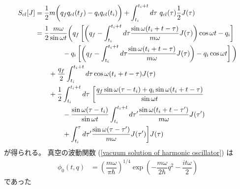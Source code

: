 \begin{align}
    S_{cl} [J]
    &=
    \frac{1}{2} m
    \bigg(
        q_f
        \dot{q}_{cl}(t_f)
    -
        q_i
        \dot{q}_{cl}(t_i)
    \bigg)
    +
    \int_{t_i}^{t_i + t} d\tau\ 
        q_{cl}(\tau)
        \frac{1}{2}
        J(\tau)
\notag\\&
    =
    \frac{1}{2}
    \frac{ m \omega }{ \sin \omega t }
    \bigg(
        q_f
        \left[
            \left(
                q_f
            -
                \int_{t_i}^{t_i + t} d\tau
                \frac{ \sin \omega (t_i + t - \tau) }{m\omega}
                J(\tau)
            \right)
            \cos \omega t
        -
            q_i
        \right]
\notag\\&\qquad\qquad
    -
        q_i
        \left[
            \left(
                q_f
            -
                \int_{t_i}^{t_i + t} d\tau
                \frac{ \sin \omega (t_i + t - \tau) }{m\omega}
                J(\tau)
            \right)
        -
            q_i \cos \omega t
        \right]
    \bigg)
\notag\\&\qquad
    +
        \frac{q_f}{2}
        \int_{t_i}^{t_i + t} d\tau
        \cos \omega (t_i + t - \tau)
        J(\tau)
\notag\\&\qquad
    +
    \frac{1}{2}
    \int_{t_i}^{t_i + t} d\tau\ 
    \bigg[
        \frac{
            q_f \sin \omega (\tau - t_i)
        +
            q_i \sin \omega (t_i + t - \tau)
        }{ \sin \omega t }
\notag\\&\qquad\qquad
    -
        \frac{ \sin \omega (\tau - t_i) }{
            \sin \omega t
        }
        \int_{t_i}^{t_i + t} d\tau'
        \frac{ \sin \omega (t_i + t - \tau') }{m\omega}
        J(\tau')
\notag\\&\qquad\qquad
    +
        \int_{t_i}^\tau d\tau'
        \frac{ \sin \omega (\tau - \tau')}{m\omega}
        J(\tau')
    \bigg]
    J(\tau)
\end{align}
が得られる。
真空の波動関数
(\ref{vacuum solution of harmonic oscillator})
は
\begin{align}
    \phi_0  (t, q)
    &=
    \left(
        \dfrac{m \omega}{\pi \hbar}        
    \right)^{1/4}
    \exp(
        - \dfrac{m \omega}{2 \hbar} q^2
        -
        \dfrac{i t \omega}{2}
    )
\end{align}
であった
